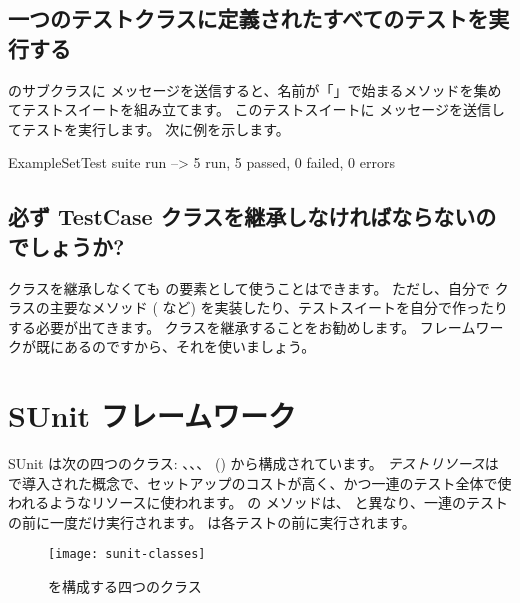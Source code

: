 \documentclass[a4paper,10pt,twoside]{book}
\begin{document}
\subsection{一つのテストクラスに定義されたすべてのテストを実行する}

 のサブクラスに  メッセージを送信すると、名前が「」で始まるメソッドを集めてテストスイートを組み立てます。
このテストスイートに  メッセージを送信してテストを実行します。
次に例を示します。

\begin{code}{}
ExampleSetTest suite run --> 5 run, 5 passed, 0 failed, 0 errors
\end{code}

\subsection{必ず TestCase クラスを継承しなければならないのでしょうか?}

 クラスを継承しなくても  の要素として使うことはできます。
ただし、自分で  クラスの主要なメソッド ( など) を実装したり、テストスイートを自分で作ったりする必要が出てきます。
 クラスを継承することをお勧めします。
フレームワークが既にあるのですから、それを使いましょう。


\section{SUnit フレームワーク}

SUnit は次の四つのクラス:
、、、 () から構成されています。
\emph{テストリソース}は  で導入された概念で、セットアップのコストが高く、かつ一連のテスト全体で使われるようなリソースに使われます。
 の  メソッドは、 と異なり、一連のテストの前に一度だけ実行されます。
 は各テストの前に実行されます。

\begin{figure}[htb]
  \begin{center}
		{\texttt{[image: sunit-classes]}}
	\caption{\SUnit を構成する四つのクラス}
  \end{center}
\end{figure}
\end{document}
